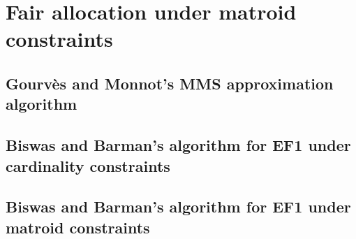 \chapter{Fair allocation under matroid constraints}
\skelpars[2]

\section{Gourvès and Monnot's MMS approximation algorithm}
\skelpars[12]

\section{Biswas and Barman's algorithm for EF1 under cardinality constraints}
\skelpars[8]

\section{Biswas and Barman's algorithm for EF1 under matroid constraints}
\skelpars[8]